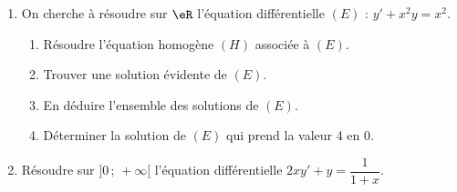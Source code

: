 
\begin{exercice}\label{exoautoanalyseCTU-34}


\begin{enumerate}
\item On cherche à résoudre sur $\eR$ l'équation différentielle $(E)$ : $y'+x^2y=x^2$.
\begin{enumerate}
\item Résoudre l'équation homogène $(H)$ associée à $(E)$.
\item Trouver une solution évidente de $(E)$.
\item En déduire l'ensemble des solutions de $(E)$.
\item Déterminer la solution de $(E)$ qui prend la valeur 4 en 0.
\end{enumerate}


\item Résoudre  sur $]0\,;\,+\infty[$ l'équation différentielle $2xy'+y=\dfrac{1}{1+x}$.
\end{enumerate}




\end{exercice}
